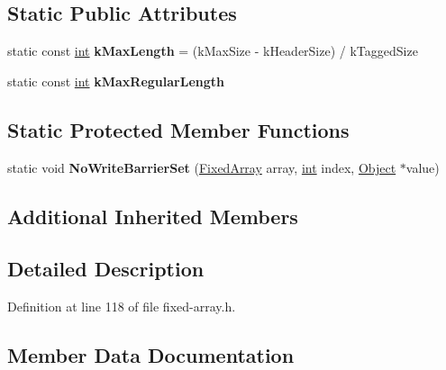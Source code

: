 \subsection*{Static Public Attributes}
\begin{DoxyCompactItemize}
\item 
\mbox{\label{classv8_1_1internal_1_1FixedArray_affb031e7f10c06f0dd174029fc56efe2}} 
static const \mbox{\hyperlink{classint}{int}} {\bfseries k\+Max\+Length} = (k\+Max\+Size -\/ k\+Header\+Size) / k\+Tagged\+Size
\item 
static const \mbox{\hyperlink{classint}{int}} {\bfseries k\+Max\+Regular\+Length}
\end{DoxyCompactItemize}
\subsection*{Static Protected Member Functions}
\begin{DoxyCompactItemize}
\item 
\mbox{\label{classv8_1_1internal_1_1FixedArray_a4bef286781130464d5ffd8abec707714}} 
static void {\bfseries No\+Write\+Barrier\+Set} (\mbox{\hyperlink{classv8_1_1internal_1_1FixedArray}{Fixed\+Array}} array, \mbox{\hyperlink{classint}{int}} index, \mbox{\hyperlink{classv8_1_1internal_1_1Object}{Object}} $\ast$value)
\end{DoxyCompactItemize}
\subsection*{Additional Inherited Members}


\subsection{Detailed Description}


Definition at line 118 of file fixed-\/array.\+h.



\subsection{Member Data Documentation}
\mbox{\label{classv8_1_1internal_1_1FixedArray_a303fea62618aa216ba3704cd7c417f63}} 
